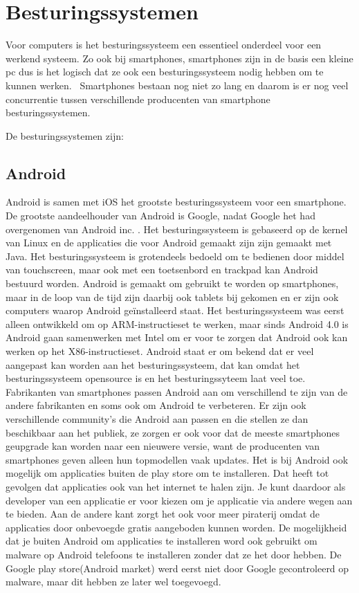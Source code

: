 \chapter{Besturingssystemen}

Voor computers is het besturingssysteem een essentieel onderdeel voor een werkend systeem. Zo ook bij smartphones, smartphones zijn in de basis een kleine pc dus is het logisch dat ze ook een besturingssysteem nodig hebben om te kunnen werken.  Smartphones bestaan nog niet zo lang en daarom is er nog veel concurrentie tussen verschillende producenten van smartphone besturingssystemen.

De besturingssystemen zijn:

\section{Android}

Android is samen met iOS het grootste besturingssysteem voor een smartphone. De grootste aandeelhouder van Android is Google, nadat Google het had overgenomen van Android inc. . Het besturingssysteem is gebaseerd op de kernel van Linux en de applicaties die voor Android gemaakt zijn zijn gemaakt met Java. Het besturingssysteem is grotendeels bedoeld om te bedienen door middel van touchscreen, maar ook met een toetsenbord en trackpad kan Android bestuurd worden. Android is gemaakt om gebruikt te worden op smartphones, maar in de loop van de tijd zijn daarbij ook tablets bij gekomen en er zijn ook computers waarop Android geïnstalleerd staat. Het besturingssysteem was eerst alleen ontwikkeld om op ARM-instructieset te werken, maar sinds Android 4.0 is Android gaan samenwerken met Intel om er voor te zorgen dat Android ook kan werken op het X86-instructieset. Android staat er om bekend dat er veel aangepast kan worden aan het besturingssysteem, dat kan omdat het besturingssysteem opensource is en het besturingssyteem laat veel toe. Fabrikanten van smartphones passen Android aan om verschillend te zijn van de andere fabrikanten en soms ook om Android te verbeteren. Er zijn ook verschillende community's die Android aan passen en die stellen ze dan beschikbaar aan het publiek, ze zorgen er ook voor dat de meeste smartphones geupgrade kan worden naar een nieuwere versie, want de producenten van smartphones geven alleen hun topmodellen vaak updates. Het is bij Android ook mogelijk om applicaties buiten de play store om te installeren. Dat heeft tot gevolgen dat applicaties ook van het internet te halen zijn. Je kunt daardoor als developer van een applicatie er voor kiezen om je applicatie via andere wegen aan te bieden. Aan de andere kant zorgt het ook voor meer piraterij omdat de applicaties door onbevoegde gratis aangeboden kunnen worden. De mogelijkheid dat je buiten Android om applicaties te installeren word ook gebruikt om malware op Android telefoons te installeren zonder dat ze het door hebben. De Google play store(Android market) werd eerst niet door Google gecontroleerd op malware, maar dit hebben ze later wel toegevoegd.


